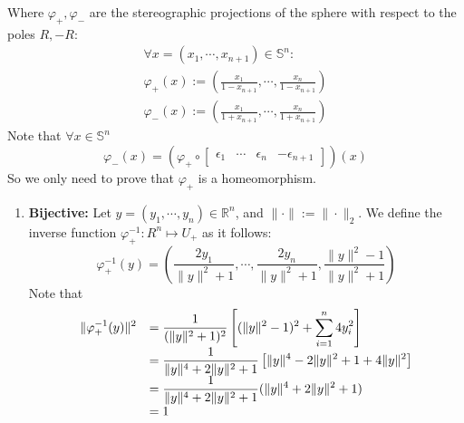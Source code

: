 \documentclass[12pt]{exam}
\def\R{\ensuremath{\mathbb{R}}}
\def\S{\ensuremath{\mathbb{S}}}
\begin{document}
Where $\varphi_+, \varphi_-$ are the stereographic projections of the sphere with respect to the poles $R, -R$:
\[ \begin{array}{l}
\forall x = (x_1,\cdots , x_{n+1}) \in \S^{n}:\\
 \varphi_+ (x) := \left(\tfrac{x_1}{1-x_{n+1}}, \cdots, \tfrac{x_n}{1-x_{n+1}}\right)\\
\varphi_- (x) := \left(\tfrac{x_1}{1+x_{n+1}}, \cdots, \tfrac{x_n}{1+x_{n+1}}\right)
\end{array}\]
Note that $\forall x \in \S^{n}$
\[\varphi_-(x) = \left(\varphi_+ \circ \begin{bmatrix}
    \epsilon_1 & \cdots & \epsilon_n & -\epsilon_{n+1}
\end{bmatrix}\right)(x)\]
So we only need to prove that $\varphi_+$ is a homeomorphism.

\begin{enumerate}
    \item \textbf{Bijective:} Let $y = (y_1,\cdots,y_n) \in \R^n$, and $\|\cdot\| := \|\cdot\|_2$. We define the inverse function $\varphi_+^{-1}: R^n \mapsto U_+$ as it follows:
    \[\varphi_+^{-1}(y) = \left(\frac{2y_1}{\|y\|^2 + 1}, \cdots,\frac{2y_n}{\|y\|^2 + 1}, \frac{\|y\|^2 -1}{\|y\|^2 + 1}\right)\]
    Note that
    \[ \everymath{\displaystyle} \begin{array}{ll}
        \|\varphi_+^{-1}(y)\|^2 & = \frac{1}{(\|y\|^2 + 1)^2}\left[(\|y\|^2-1)^2 + \sum_{i = 1}^n 4y_i^2\right] \\
        & = \frac{1}{\|y\|^4+2\|y\|^2+1} \left[\|y\|^4 -2\|y\|^2 + 1 + 4\|y\|^2\right] \\
        & = \frac{1}{\|y\|^4+2\|y\|^2+1} (\|y\|^4+2\|y\|^2+1) \\
        & = 1
    \end{array}\]
\end{enumerate}
\end{document}
